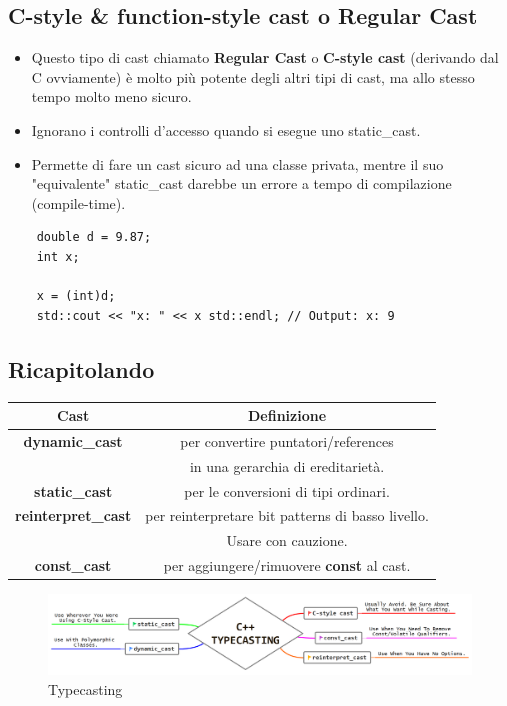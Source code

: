 \subsection{C-style \& function-style cast o Regular Cast}

\begin{itemize}
	\item \textsf{\small Questo tipo di cast chiamato \textbf{Regular Cast} o \textbf{C-style cast} (derivando dal C ovviamente) è molto più potente degli altri tipi di cast, ma allo stesso tempo molto meno sicuro.}
	\item \textsf{\small Ignorano i controlli d'accesso quando si esegue uno static\_cast.}
	\item \textsf{\small Permette di fare un cast sicuro ad una classe privata, mentre il suo "equivalente" static\_cast darebbe un errore a tempo di compilazione (compile-time).}
\end{itemize}

\begin{lstlisting}
	double d = 9.87;
	int x;
	
	x = (int)d;
	std::cout << "x: " << x std::endl; // Output: x: 9
\end{lstlisting}

\subsection{Ricapitolando}

\begin{tabular}{|c|c|}
	\hline
	\textbf{Cast} & \textbf{Definizione} \\
	\hline
	\textbf{dynamic\_cast} & \textsf{\small per convertire puntatori/references } \\
	\textbf{} & \textsf{\small in una gerarchia di ereditarietà.} \\
	\hline
	\textbf{static\_cast} & \textsf{\small per le conversioni di tipi ordinari.} \\
	\hline
	\textbf{reinterpret\_cast} & \textsf{\small per reinterpretare bit patterns di basso livello. } \\
	\textbf{} & \textsf{\small Usare con cauzione.} \\
	\hline
	\textbf{const\_cast} & \textsf{\small per aggiungere/rimuovere \textbf{const} al cast.} \\
	\hline
\end{tabular}

\begin{figure}[ht]
	\centering
	\includegraphics[width=1\textwidth, height=1\textheight, keepaspectratio]{./imgs/typecasting.png}
	\caption{Typecasting}
	\label{fig:typecasting}
\end{figure}

